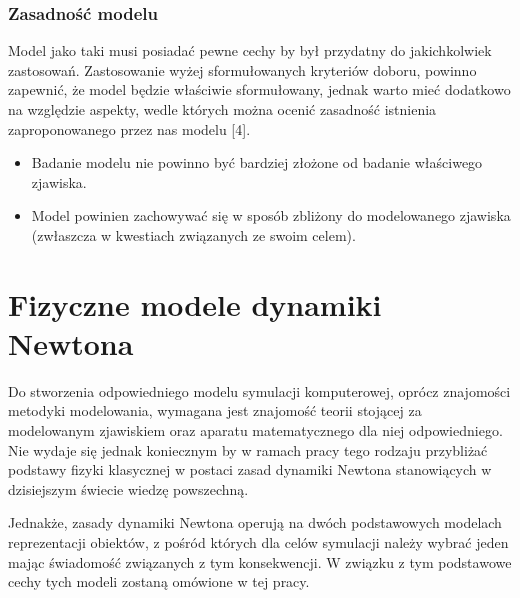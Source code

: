 \subsubsection{Zasadność modelu}
\par{
Model jako taki musi posiadać pewne cechy by był przydatny do jakichkolwiek zastosowań. Zastosowanie wyżej sformułowanych kryteriów doboru, powinno zapewnić, że model będzie właściwie sformułowany, jednak warto mieć dodatkowo na względzie  aspekty, wedle których można ocenić zasadność istnienia zaproponowanego przez nas modelu [4].
\begin{itemize}
\renewcommand{\labelitemi}{$\bullet$}
\item Badanie modelu nie powinno być bardziej złożone od badanie właściwego zjawiska.
\item Model powinien zachowywać się w sposób zbliżony do modelowanego zjawiska (zwłaszcza w kwestiach związanych ze swoim celem).
\end{itemize}
}


\section[Fizyczne modele dynamiki Newtona][Fizyczne modele dynamiki Newtona]{Fizyczne modele dynamiki Newtona}

\par{
Do stworzenia odpowiedniego modelu symulacji komputerowej, oprócz znajomości metodyki modelowania, wymagana jest znajomość teorii stojącej za modelowanym zjawiskiem oraz aparatu matematycznego dla niej odpowiedniego. Nie wydaje się jednak koniecznym by w ramach pracy tego rodzaju przybliżać podstawy fizyki klasycznej w postaci zasad dynamiki Newtona stanowiących w dzisiejszym świecie wiedzę powszechną.
}
\par{
Jednakże, zasady dynamiki Newtona operują na dwóch podstawowych modelach reprezentacji obiektów, z pośród których dla celów symulacji należy wybrać jeden mając świadomość związanych z tym konsekwencji. W związku z tym podstawowe cechy tych modeli zostaną omówione w tej pracy.
}

